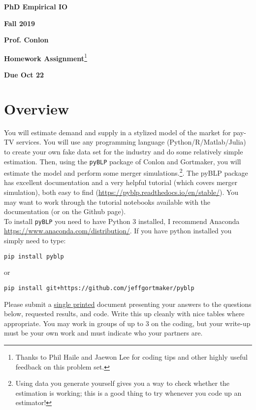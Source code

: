 \documentclass[english,11pt]{article}
\begin{document}
\begin{center}
\textbf{PhD Empirical IO}

\textbf{Fall 2019}

\textbf{Prof. Conlon}

\textbf{Homework Assignment}\footnote{Thanks to Phil Haile and Jaewon Lee for coding tips and other highly useful feedback on this problem set.}


\textbf{Due Oct 22}
\end{center}

\bigskip

\section*{Overview}

You will estimate demand and supply in a stylized model of the market for
pay-TV services. You will use any programming language (Python/R/Matlab/Julia) to create your own fake data set for the industry and do some
relatively simple estimation. Then, using the \texttt{pyBLP} package of Conlon and Gortmaker, you will
estimate the model and perform some merger simulations.\footnote{%
Using data you generate yourself gives you a way to check whether the
estimation is working; this is a good thing to try whenever you code up an
estimator!}. The pyBLP package has excellent
documentation and a very helpful tutorial (which covers merger simulation),
both easy to find (\url{https://pyblp.readthedocs.io/en/stable/}). You may want to work through the tutorial notebooks available with the documentation (or on the Github page).\\


To install \texttt{pyBLP} you need to have Python 3 installed, I recommend Anaconda \url{https://www.anaconda.com/distribution/}. If you have python installed you simply need to type:
\begin{verbatim}
pip install pyblp
\end{verbatim}
or 
\begin{verbatim}
pip install git+https://github.com/jeffgortmaker/pyblp
\end{verbatim}

Please submit a \underline{single printed} document presenting your answers to the questions below,
requested results, and code. Write this up cleanly with nice tables where appropriate.
You may work in groups of up to 3 on the coding, but your write-up must be your own work and must indicate who your partners are.
\end{document}
